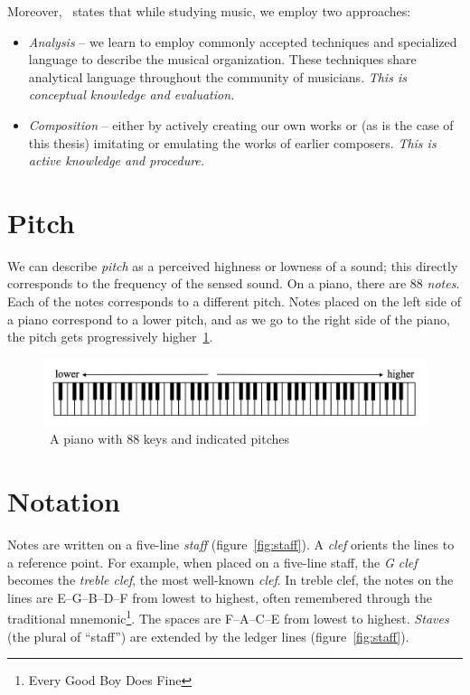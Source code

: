Moreover,~\cite{music-theory-andrew} states that while studying music, we employ two approaches:
\begin{itemize}
    \item \textit{Analysis} -- we learn to employ commonly accepted techniques and specialized language to describe the musical organization.
    These techniques share analytical language throughout the community of musicians.
    \textit{This is conceptual knowledge and evaluation.}
    \item \textit{Composition} -- either by actively creating our own works or (as is the case of this thesis) imitating or emulating the works of earlier composers.
    \textit{This is active knowledge and procedure.}
\end{itemize}


\section{Pitch}\label{sec:pitch}

We can describe \textit{pitch} as a perceived highness or lowness of a sound;
this directly corresponds to the frequency of the sensed sound.
On a piano, there are 88 \textit{notes}.
Each of the notes corresponds to a different pitch.
Notes placed on the left side of a piano correspond to a lower pitch, and as we go to the right side of the piano, the pitch gets progressively higher~\ref{fig:piano}.~\cite{music-theory}

\begin{figure}
    \centering
    \includegraphics[width=\textwidth]{assets/piano}
    \caption{~A piano with 88 keys and indicated pitches~\cite{music-theory}}\label{fig:piano}
\end{figure}


\section{Notation}\label{sec:notation}

Notes are written on a five-line \textit{staff} (figure~\ref{fig:staff}).
A \textit{clef} orients the lines to a reference point.
For example, when placed on a five-line staff, the \textit{G clef} becomes the \textit{treble clef}, the most well-known \textit{clef}.
In treble clef, the notes on the lines are E--G--B--D--F from lowest to highest, often remembered through the traditional mnemonic\footnote{Every Good Boy Does Fine}.
The spaces are F--A--C--E from lowest to highest.
\textit{Staves} (the plural of ``staff'') are extended by the ledger lines (figure~\ref{fig:staff}).~\cite{music-theory}


